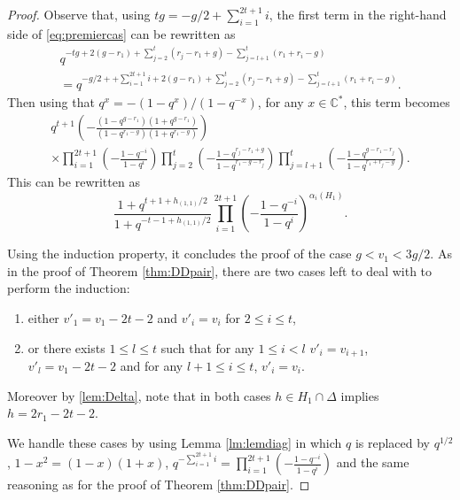 \documentclass[11pt,letterpaper]{amsart}
\numberwithin{equation}{section}
\numberwithin{df}{section}
\begin{document}
\begin{proof}
Observe that, using $tg=-g/2+\sum_{i=1}^{2t+1}i$, the first term in the right-hand side of \eqref{eq:premiercas} can be rewritten as
\begin{multline*}
q^{-tg+2(g-r_1)+\sum_{j=2}^t(r_j-r_1+g)-\sum_{j=l+1}^t(r_1+r_i-g)}\\
=q^{-g/2++\sum_{i=1}^{2t+1}i+2(g-r_1)+\sum_{j=2}^t(r_j-r_1+g)-\sum_{j=l+1}^t(r_1+r_i-g)}.
\end{multline*}
 Then using that $q^{x}=-(1-q^{x})/(1-q^{-x})$, for any $x\in\mathbb{C}^*$, this term becomes
\begin{multline*}
q^{t+1}\left(-\frac{(1-q^{g-r_1})(1+q^{g-r_1})}{(1-q^{r_1-g})(1+q^{r_1-g})}\right)\\ \times
\prod_{i=1}^{2t+1}\left(-\frac{1-q^{-i}}{1-q^i}\right)\prod_{j=2}^t\left(-\frac{1-q^{r_j-r_1+g}}{1-q^{r_1-g-r_j}}\right)
\prod_{j=l+1}^t\left(-\frac{1-q^{g-r_1-r_j}}{1-q^{r_1+r_j-g}}\right).
\end{multline*}
This can be rewritten as
$$\frac{1+q^{t+1+h_{(1,1)}/2}}{1+q^{-t-1+h_{(1,1)}/2}}\prod_{i=1}^{2t+1}\left(-\frac{1-q^{-i}}{1-q^{i}}\right)^{\alpha_i(H_{1})}.$$

Using the induction property, it concludes the proof of the case $g<v_1<3g/2$.
As in the proof of Theorem \ref{thm:DDpair}, there are two cases left to deal with to perform the induction:
\begin{enumerate}
\item either $v'_1=v_1-2t-2$ and $v'_i=v_i$ for $2\leq i\leq t$,
\item or there exists $1\leq l\leq t$ such that for any $1\leq i<l$ $v'_i=v_{i+1}$, $v'_l=v_1-2t-2$ and for any $l+1\leq i\leq t$, $v'_i=v_i$.
\end{enumerate}
Moreover by \eqref{lem:Delta}, note that in both cases $h\in H_1\cap\Delta$ implies $h=2r_1-2t-2$.

We handle these cases by using Lemma \ref{lm:lemdiag} in which $q$ is replaced by $q^{1/2}$, $1-x^2=(1-x)(1+x)$, $q^{-\sum_{i=1}^{2t+1}i}=\prod_{i=1}^{2t+1}\left(-\frac{1-q^{-i}}{1-q^{i}}\right)$ and the same reasoning as for the proof of Theorem \ref{thm:DDpair}.
\end{proof} 
\end{document}
